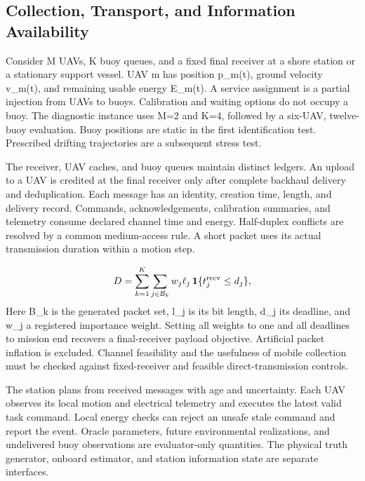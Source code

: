 \documentclass[10pt,twocolumn,letterpaper]{article}
\begin{document}
\subsection{Collection, Transport, and Information Availability}
Consider M UAVs, K buoy queues, and a fixed final receiver at a shore station or a stationary support vessel. UAV m has position p\_m(t), ground velocity v\_m(t), and remaining usable energy E\_m(t). A service assignment is a partial injection from UAVs to buoys. Calibration and waiting options do not occupy a buoy. The diagnostic instance uses M=2 and K=4, followed by a six-UAV, twelve-buoy evaluation. Buoy positions are static in the first identification test. Prescribed drifting trajectories are a subsequent stress test.

The receiver, UAV caches, and buoy queues maintain distinct ledgers. An upload to a UAV is credited at the final receiver only after complete backhaul delivery and deduplication. Each message has an identity, creation time, length, and delivery record. Commands, acknowledgements, calibration summaries, and telemetry consume declared channel time and energy. Half-duplex conflicts are resolved by a common medium-access rule. A short packet uses its actual transmission duration within a motion step.

\begin{equation}
D=\sum_{k=1}^{K}\sum_{j\in\mathcal B_k} w_j\ell_j\,\mathbf 1\{t^{\rm recv}_j\le d_j\},
\end{equation}
Here B\_k is the generated packet set, l\_j is its bit length, d\_j its deadline, and w\_j a registered importance weight. Setting all weights to one and all deadlines to mission end recovers a final-receiver payload objective. Artificial packet inflation is excluded. Channel feasibility and the usefulness of mobile collection must be checked against fixed-receiver and feasible direct-transmission controls.

The station plans from received messages with age and uncertainty. Each UAV observes its local motion and electrical telemetry and executes the latest valid task command. Local energy checks can reject an unsafe stale command and report the event. Oracle parameters, future environmental realizations, and undelivered buoy observations are evaluator-only quantities. The physical truth generator, onboard estimator, and station information state are separate interfaces.
\end{document}

